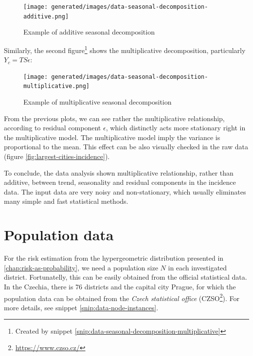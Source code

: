 \documentclass[
  digital, %
  oneside, %
  lof,     %
  lot,     %
]{fithesis4}
\begin{document}
\begin{figure}[H]
  \begin{center}
    \texttt{[image: generated/images/data-seasonal-decomposition-additive.png]}
  \end{center}
  \caption{Example of additive seasonal decomposition}
  \label{fig:seasonal-decomposition-additive}
\end{figure}

Similarly, the second figure\footnote{Created by snippet \ref{snip:data-seasonal-decomposition-multiplicative}}
shows the multiplicative decomposition, particularly $Y_c = T S \epsilon$:

\begin{figure}[H]
  \begin{center}
    \texttt{[image: generated/images/data-seasonal-decomposition-multiplicative.png]}
  \end{center}
  \caption{Example of multiplicative seasonal decomposition}
  \label{fig:seasonal-decomposition-multiplicative}
\end{figure}

From the previous plots, we can see rather the multiplicative 
relationship, according to residual component $\epsilon$, 
which distinctly acts more stationary right in the 
multiplicative model. 
The multiplicative model imply the variance is proportional 
to the mean. This effect can be also visually checked  
in the raw data (figure \ref{fig:largest-cities-incidence}).

To conclude, the data analysis shown multiplicative 
relationship, rather than additive, between trend, seasonality and residual 
components in the incidence data. 
The input data are very noisy and non-stationary, which 
usually eliminates many simple and fast statistical methods. 





\section{Population data}

For the risk estimation from the hypergeometric distribution
presented in \autoref{chap:risk-as-probability}, we need a population size 
$N$ in each investigated district.
Fortunatelly, this can be easily obtained from the official statistical data.
In the Czechia, there is 76 districts and the capital city Prague,
for which the population data can be obtained from the \textit{Czech
statistical office} (CZSO\footnote{\url{https://www.czso.cz/}}).
For more details, see snippet \ref{snip:data-node-instances}.
\end{document}
